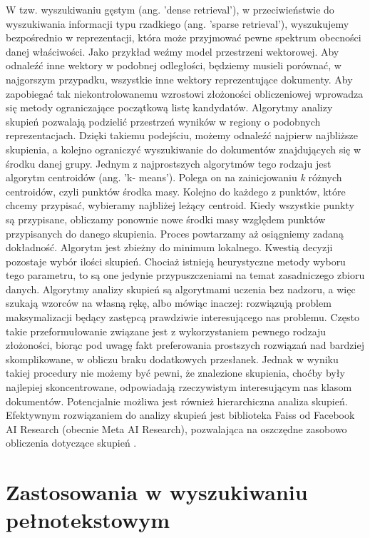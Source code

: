 W tzw. wyszukiwaniu gęstym (ang. 'dense retrieval'), w przeciwieństwie do wyszukiwania
informacji typu rzadkiego (ang. 'sparse retrieval'), wyszukujemy bezpośrednio w reprezentacji, która
może przyjmować pewne spektrum obecności danej właściwości. Jako przykład weźmy model
przestrzeni wektorowej. Aby odnaleźć inne wektory w podobnej odległości, będziemy musieli
porównać, w najgorszym przypadku, wszystkie inne wektory reprezentujące dokumenty. Aby
zapobiegać tak niekontrolowanemu wzrostowi złożoności obliczeniowej wprowadza się metody
ograniczające początkową listę kandydatów. Algorytmy analizy skupień pozwalają podzielić przestrzeń
wyników w regiony o podobnych reprezentacjach. Dzięki takiemu podejściu, możemy odnaleźć
najpierw najbliższe skupienia, a kolejno ograniczyć wyszukiwanie do dokumentów znajdujących się w
środku danej grupy. Jednym z najprostszych algorytmów tego rodzaju jest algorytm centroidów (ang. 'k-
means'). Polega on na zainicjowaniu {\it k} różnych centroidów, czyli punktów środka masy. Kolejno do
każdego z punktów, które chcemy przypisać, wybieramy najbliżej leżący centroid. Kiedy wszystkie
punkty są przypisane, obliczamy ponownie nowe środki masy względem punktów przypisanych do
danego skupienia. Proces powtarzamy aż osiągniemy zadaną dokładność. Algorytm jest zbieżny do
minimum lokalnego. Kwestią decyzji pozostaje wybór ilości skupień. Chociaż istnieją heurystyczne
metody wyboru tego parametru, to są one jedynie przypuszczeniami na temat zasadniczego zbioru danych. Algorytmy analizy skupień są algorytmami uczenia bez nadzoru, a więc szukają wzorców na
własną rękę, albo mówiąc inaczej: rozwiązują problem maksymalizacji będący zastępcą prawdziwie interesującego nas problemu. Często takie przeformułowanie związane jest z wykorzystaniem pewnego rodzaju złożoności, biorąc pod uwagę fakt preferowania prostszych rozwiązań nad bardziej skomplikowane, w obliczu braku dodatkowych przesłanek. Jednak w wyniku takiej procedury nie możemy być pewni, że znalezione skupienia, choćby
były najlepiej skoncentrowane, odpowiadają rzeczywistym interesującym nas klasom dokumentów.
Potencjalnie możliwa jest również hierarchiczna analiza skupień. Efektywnym rozwiązaniem do analizy skupień jest
biblioteka Faiss od Facebook AI Research (obecnie Meta AI Research), pozwalająca na oszczędne zasobowo obliczenia dotyczące
skupień \autocite{johnson2019billion}.


\section{Zastosowania w wyszukiwaniu pełnotekstowym}

